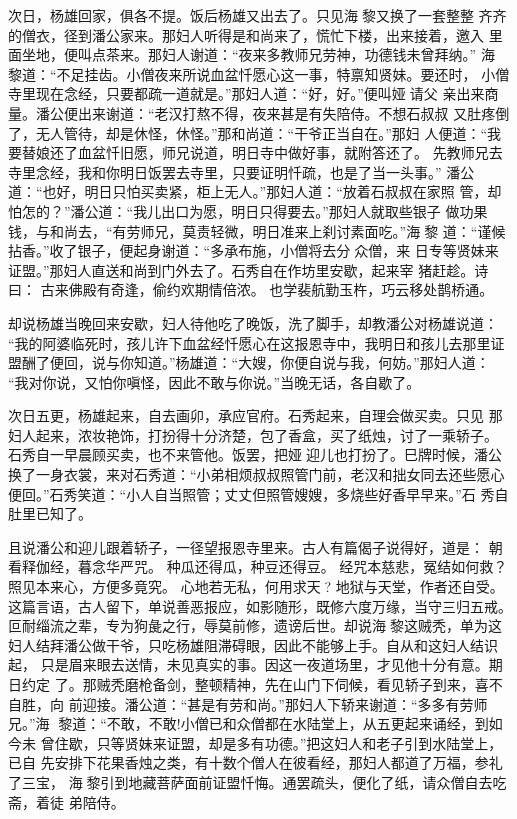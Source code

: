 次日，杨雄回家，俱各不提。饭后杨雄又出去了。只见海黎又换了一套整整
齐齐的僧衣，径到潘公家来。那妇人听得是和尚来了，慌忙下楼，出来接着，邀入
里面坐地，便叫点茶来。那妇人谢道：“夜来多教师兄劳神，功德钱未曾拜纳。”
海黎道：“不足挂齿。小僧夜来所说血盆忏愿心这一事，特禀知贤妹。要还时，
小僧寺里现在念经，只要都疏一道就是。”那妇人道：“好，好。”便叫娅请父
亲出来商量。潘公便出来谢道：“老汉打熬不得，夜来甚是有失陪侍。不想石叔叔
又肚疼倒了，无人管待，却是休怪，休怪。”那和尚道：“干爷正当自在。”那妇
人便道：“我要替娘还了血盆忏旧愿，师兄说道，明日寺中做好事，就附答还了。
先教师兄去寺里念经，我和你明日饭罢去寺里，只要证明忏疏，也是了当一头事。”
潘公道：“也好，明日只怕买卖紧，柜上无人。”那妇人道：“放着石叔叔在家照
管，却怕怎的？”潘公道：“我儿出口为愿，明日只得要去。”那妇人就取些银子
做功果钱，与和尚去，“有劳师兄，莫责轻微，明日准来上刹讨素面吃。”海黎
道：“谨候拈香。”收了银子，便起身谢道：“多承布施，小僧将去分众僧，来
日专等贤妹来证盟。”那妇人直送和尚到门外去了。石秀自在作坊里安歇，起来宰
猪赶趁。诗曰：
古来佛殿有奇逢，偷约欢期情倍浓。
也学裴航勤玉杵，巧云移处鹊桥通。

却说杨雄当晚回来安歇，妇人待他吃了晚饭，洗了脚手，却教潘公对杨雄说道：
“我的阿婆临死时，孩儿许下血盆经忏愿心在这报恩寺中，我明日和孩儿去那里证
盟酬了便回，说与你知道。”杨雄道：“大嫂，你便自说与我，何妨。”那妇人道：
“我对你说，又怕你嗔怪，因此不敢与你说。”当晚无话，各自歇了。

次日五更，杨雄起来，自去画卯，承应官府。石秀起来，自理会做买卖。只见
那妇人起来，浓妆艳饰，打扮得十分济楚，包了香盒，买了纸烛，讨了一乘轿子。
石秀自一早晨顾买卖，也不来管他。饭罢，把娅迎儿也打扮了。巳牌时候，潘公
换了一身衣裳，来对石秀道：“小弟相烦叔叔照管门前，老汉和拙女同去还些愿心
便回。”石秀笑道：“小人自当照管；丈丈但照管嫂嫂，多烧些好香早早来。”石
秀自肚里已知了。

且说潘公和迎儿跟着轿子，一径望报恩寺里来。古人有篇偈子说得好，道是：
朝看释伽经，暮念华严咒。
种瓜还得瓜，种豆还得豆。
经咒本慈悲，冤结如何救？
照见本来心，方便多竟究。
心地若无私，何用求天?
地狱与天堂，作者还自受。
这篇言语，古人留下，单说善恶报应，如影随形，既修六度万缘，当守三归五戒。
叵耐缁流之辈，专为狗彘之行，辱莫前修，遗谤后世。却说海黎这贼秃，单为这
妇人结拜潘公做干爷，只吃杨雄阻滞碍眼，因此不能够上手。自从和这妇人结识起，
只是眉来眼去送情，未见真实的事。因这一夜道场里，才见他十分有意。期日约定
了。那贼秃磨枪备剑，整顿精神，先在山门下伺候，看见轿子到来，喜不自胜，向
前迎接。潘公道：“甚是有劳和尚。”那妇人下轿来谢道：“多多有劳师兄。”海
黎道：“不敢，不敢!小僧已和众僧都在水陆堂上，从五更起来诵经，到如今未
曾住歇，只等贤妹来证盟，却是多有功德。”把这妇人和老子引到水陆堂上，已自
先安排下花果香烛之类，有十数个僧人在彼看经，那妇人都道了万福，参礼了三宝，
海黎引到地藏菩萨面前证盟忏悔。通罢疏头，便化了纸，请众僧自去吃斋，着徒
弟陪侍。

